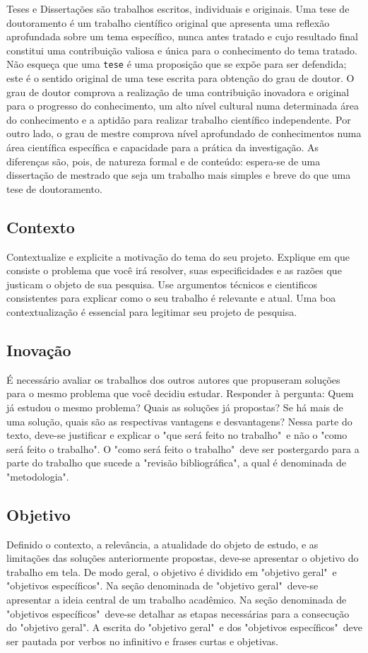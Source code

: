 Teses e Dissertações são trabalhos escritos, individuais e
originais. Uma tese de doutoramento é um trabalho científico original
que apresenta uma reflexão aprofundada sobre um tema específico,
nunca antes tratado e cujo resultado final constitui uma contribuição
valiosa e única para o conhecimento do tema tratado. Não esqueça
que uma \texttt{tese} é uma proposição que se expõe para ser
defendida; este é o sentido original de uma tese escrita para
obtenção do grau de doutor. O grau de doutor comprova a
realização de uma contribuição inovadora e original para o
progresso do conhecimento, um alto nível cultural numa determinada
área do conhecimento e a aptidão para realizar trabalho
científico independente. Por outro lado, o grau de mestre comprova nível aprofundado
de conhecimentos numa área científica específica e capacidade
para a prática da investigação. As diferenças são, pois,
de natureza formal e de conteúdo: espera-se de uma dissertação de
mestrado que seja um trabalho mais simples e breve do que uma tese de doutoramento.

\subsection{Contexto}
Contextualize e explicite a motivação do tema do seu projeto. Explique em que consiste o problema que você irá resolver, suas especificidades e as razões que justicam o objeto de sua pesquisa. Use argumentos técnicos e cientificos consistentes para explicar como o seu trabalho é relevante e  atual. Uma boa contextualização é essencial para legitimar seu projeto de pesquisa.

\subsection{Inovação}
É necessário avaliar os trabalhos dos outros autores que propuseram soluções para o mesmo problema que você decidiu estudar. Responder à pergunta: Quem já estudou o mesmo problema? Quais as soluções já propostas? Se há mais de uma solução, quais são as respectivas vantagens e desvantagens? Nessa parte do texto, deve-se justificar e explicar o "que será feito no trabalho"\ e não o "como será feito o trabalho". O "como será feito o trabalho"\ deve ser postergardo para a parte do trabalho que sucede a "revisão bibliográfica", a qual é denominada de "metodologia".

\subsection{Objetivo}
Definido o contexto, a relevância, a atualidade do objeto de estudo, e as limitações das soluções anteriormente propostas, deve-se apresentar o objetivo do trabalho em tela. De modo geral, o objetivo é dividido em "objetivo geral"\ e "objetivos específicos". Na seção denominada de "objetivo geral"\ deve-se apresentar a ideia central de um trabalho acadêmico. Na seção denominada de "objetivos específicos"\ deve-se detalhar as etapas necessárias para a consecução do "objetivo geral". A escrita do "objetivo geral"\ e dos "objetivos específicos"\ deve ser pautada por verbos no infinitivo e frases curtas e objetivas.

